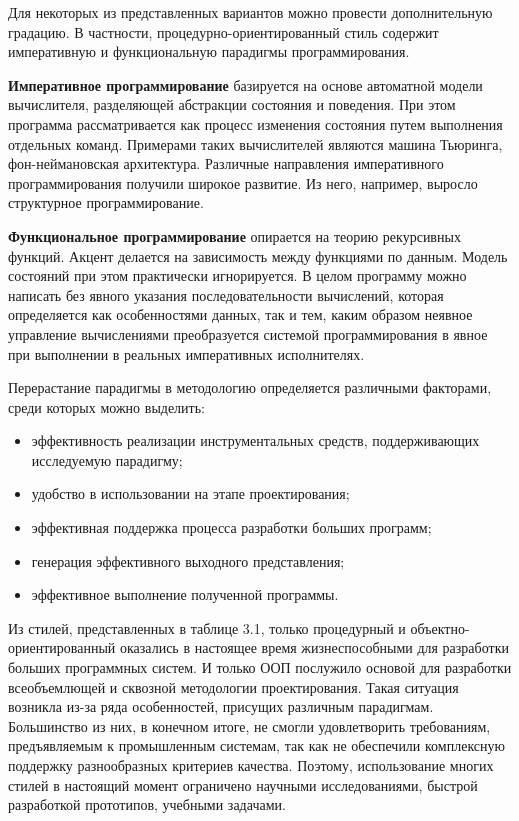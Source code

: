Для некоторых из представленных вариантов можно провести дополнительную градацию. В частности, процедурно-ориентированный стиль содержит императивную и функциональную парадигмы программирования.

\textbf{Императивное программирование} базируется на основе автоматной модели вычислителя, разделяющей абстракции состояния и поведения. При этом программа рассматривается как процесс изменения состояния путем выполнения отдельных команд. Примерами таких вычислителей являются машина Тьюринга, фон-неймановская архитектура. Различные направления императивного программирования получили широкое развитие. Из него, например, выросло структурное программирование.

\textbf{Функциональное программирование} опирается на теорию рекурсивных функций. Акцент делается на зависимость между функциями по данным. Модель состояний при этом практически игнорируется. В целом программу можно написать без явного указания последовательности вычислений, которая определяется как особенностями данных, так и тем, каким образом неявное управление вычислениями преобразуется системой программирования в явное при выполнении в реальных императивных исполнителях.

Перерастание парадигмы в методологию определяется различными факторами, среди которых можно выделить:

\begin{itemize}
    \item эффективность реализации инструментальных средств, поддерживающих исследуемую парадигму;
    \item удобство в использовании на этапе проектирования;
    \item эффективная поддержка процесса разработки больших программ;
    \item генерация эффективного выходного представления;
    \item эффективное выполнение полученной программы.
\end{itemize}

Из стилей, представленных в таблице 3.1, только процедурный и объектно-ориентированный оказались в настоящее время жизнеспособными для разработки больших программных систем. И только ООП послужило основой для разработки всеобъемлющей и сквозной методологии проектирования. Такая ситуация возникла из-за ряда особенностей, присущих различным парадигмам. Большинство из них, в конечном итоге, не смогли удовлетворить требованиям, предъявляемым к промышленным системам, так как не обеспечили комплексную поддержку разнообразных критериев качества. Поэтому, использование многих стилей в настоящий момент ограничено научными исследованиями, быстрой разработкой прототипов, учебными задачами.


